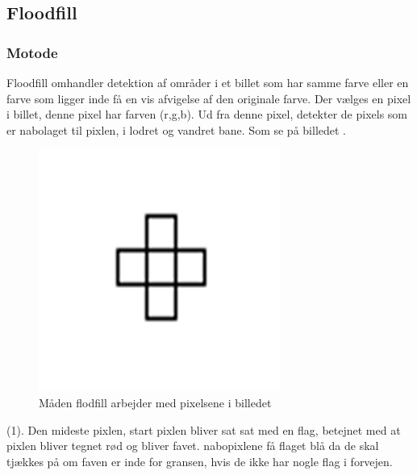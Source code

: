 \subsection*{Floodfill}

\subsubsection*{Motode}
Floodfill omhandler detektion af områder i et billet som har samme farve eller en farve som ligger inde få en vis afvigelse af den originale farve.
Der vælges en pixel i billet, denne pixel har farven (r,g,b). Ud fra denne pixel, detekter de pixels som er nabolaget til pixlen, i lodret og vandret bane. Som se på billedet $\label{floodfill1}$.

\begin{figure}[h]
	\begin{center}
		\includegraphics[scale=0.42,angle=0]{afsnit/vores_implementation/billeder/flood_fill/floodfill1}
	\end{center}
	\caption[]{Måden flodfill arbejder med pixelsene i billedet}
	\label{floodfill1}
\end{figure}

(1). Den mideste pixlen, start pixlen bliver sat sat med en flag, betejnet med at pixlen bliver tegnet rød og bliver favet. nabopixlene få flaget blå da de skal tjækkes på om faven er inde for gransen, hvis de ikke har nogle flag i forvejen.

